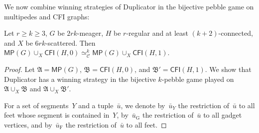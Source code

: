 \documentclass[]{lmcs}
\newcommand{\tup}[1]{\bar{#1}}
\newcommand{\vertA}{u}
\newcommand{\StructA}{\mathfrak{A}}
\newcommand{\StructB}{\mathfrak{B}}
\newcommand{\CFIsym}{\mathsf{CFI}}
\newcommand{\CFI}[1]{\CFIsym(#1)}
\newcommand{\multipede}[1]{\mathsf{MP}(#1)}
\newcommand{\footbset}{X}
\newcommand{\footbsetB}{Y}
\newcommand{\gluing}[3]{#1 \cup_#2 #3}
\newcommand{\kequiv}[1]{\simeq^#1_{\mathcal{C}}}
\newcommand{\feetrestrict}[2]{#1_{#2}}
\newcommand{\gadgetrestrict}[1]{#1_{\text{G}}}
\newcommand{\nongadgetrestrict}[1]{#1_{\text{F}}}
\begin{document}
We now combine winning strategies of Duplicator in the bijective pebble game on multipedes and CFI graphs:
\begin{lem}
	\label{lem:gluing-k-equiv}
	Let $r \geq k \geq 3$, $G$ be $2rk$-meager,
	$H$ be $r$-regular and at least $(k+2)$-connected,
	and $\footbset$ be $6rk$-scattered.
	Then $\gluing{\multipede{G}}{\footbset}{\CFI{H,0}} \kequiv{k} \gluing{\multipede{G}}{\footbset}{\CFI{H,1}}$.
\end{lem}
\begin{proof}
	Let $\StructA = \multipede{G}$,
	$\StructB = \CFI{H,0}$, and
	$\StructB' = \CFI{H,1}$.
	We show that Duplicator has a winning strategy in the bijective $k$-pebble game played on $\gluing{\StructA}{\footbset}{\StructB}$ and $\gluing{\StructA}{\footbset}{\StructB'}$.
	
	For a set of segments~$\footbsetB$ and a tuple~$\tup{\vertA}$,
	we denote by~$\feetrestrict{\tup{\vertA}}{\footbsetB}$ the restriction of~$\tup{\vertA}$ to all feet whose segment is contained in~$\footbsetB$,
	by~$\gadgetrestrict{\tup{\vertA}}$ the restriction of~$\tup{\vertA}$ to all gadget vertices,
	and by~$\nongadgetrestrict{\tup{\vertA}}$
	the restriction of~$\tup{\vertA}$ to all feet.
	

\end{proof}
\end{document}
